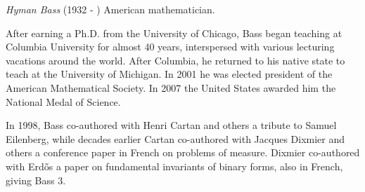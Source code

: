 \documentclass[12pt]{article}
\begin{document}

\emph{Hyman Bass} (1932 - ) American mathematician.

After earning a Ph.D. from the University of Chicago, Bass began teaching at Columbia University for almost 40 years, interspersed with various lecturing vacations around the world. After Columbia, he returned to his native state to teach at the University of Michigan. In 2001 he was elected president of the American Mathematical Society. In 2007 the United States awarded him the National Medal of Science.

In 1998, Bass co-authored with Henri Cartan and others a tribute to Samuel Eilenberg, while decades earlier Cartan co-authored with Jacques Dixmier and others a conference paper in French on problems of measure. Dixmier co-authored with Erd\H{o}s a paper on fundamental invariants of binary forms, also in French, giving Bass  3.
\end{document}
